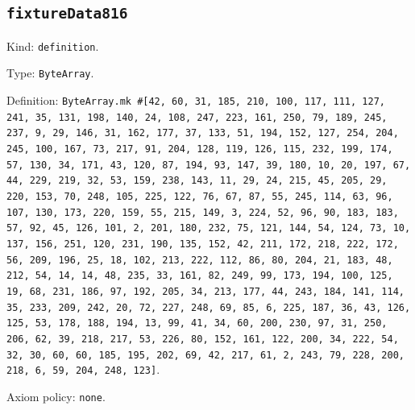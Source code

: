 \documentclass[11pt]{article}
\begin{document}
\subsection*{\texttt{fixtureData816}}
\noindent Kind: \texttt{definition}.\par
\noindent Type: \texttt{ByteArray}.\par
\noindent Definition: \texttt{ByteArray.mk \#[42, 60, 31, 185, 210, 100, 117, 111, 127, 241, 35, 131, 198, 140, 24, 108, 247, 223, 161, 250, 79, 189, 245, 237, 9, 29, 146, 31, 162, 177, 37, 133, 51, 194, 152, 127, 254, 204, 245, 100, 167, 73, 217, 91, 204, 128, 119, 126, 115, 232, 199, 174, 57, 130, 34, 171, 43, 120, 87, 194, 93, 147, 39, 180, 10, 20, 197, 67, 44, 229, 219, 32, 53, 159, 238, 143, 11, 29, 24, 215, 45, 205, 29, 220, 153, 70, 248, 105, 225, 122, 76, 67, 87, 55, 245, 114, 63, 96, 107, 130, 173, 220, 159, 55, 215, 149, 3, 224, 52, 96, 90, 183, 183, 57, 92, 45, 126, 101, 2, 201, 180, 232, 75, 121, 144, 54, 124, 73, 10, 137, 156, 251, 120, 231, 190, 135, 152, 42, 211, 172, 218, 222, 172, 56, 209, 196, 25, 18, 102, 213, 222, 112, 86, 80, 204, 21, 183, 48, 212, 54, 14, 14, 48, 235, 33, 161, 82, 249, 99, 173, 194, 100, 125, 19, 68, 231, 186, 97, 192, 205, 34, 213, 177, 44, 243, 184, 141, 114, 35, 233, 209, 242, 20, 72, 227, 248, 69, 85, 6, 225, 187, 36, 43, 126, 125, 53, 178, 188, 194, 13, 99, 41, 34, 60, 200, 230, 97, 31, 250, 206, 62, 39, 218, 217, 53, 226, 80, 152, 161, 122, 200, 34, 222, 54, 32, 30, 60, 60, 185, 195, 202, 69, 42, 217, 61, 2, 243, 79, 228, 200, 218, 6, 59, 204, 248, 123]}.\par
\noindent Axiom policy: \texttt{none}.\par
\end{document}
